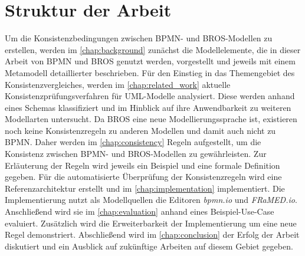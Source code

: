 \section{Struktur der Arbeit}

Um die Konsistenzbedingungen zwischen BPMN- und BROS-Modellen zu erstellen, werden im \cref{chap:background} zunächst die Modellelemente, die in dieser Arbeit von BPMN und BROS genutzt werden, vorgestellt und jeweils mit einem Metamodell detaillierter beschrieben.
Für den Einstieg in das Themengebiet des Konsistenzvergleiches, werden im \cref{chap:related_work} aktuelle Konsistenzprüfungsverfahren für UML-Modelle analysiert.
Diese werden anhand eines Schemas klassifiziert und im Hinblick auf ihre Anwendbarkeit zu weiteren Modellarten untersucht.
Da BROS eine neue Modellierungssprache ist, existieren noch keine Konsistenzregeln zu anderen Modellen und damit auch nicht zu BPMN.
Daher werden im \cref{chap:consistency} Regeln aufgestellt, um die Konsistenz zwischen BPMN- und BROS-Modellen zu gewährleisten.
Zur Erläuterung der Regeln wird jeweils ein Beispiel und eine formale Definition gegeben.
Für die automatisierte Überprüfung der Konsistenzregeln wird eine Referenzarchitektur erstellt und im \cref{chap:implementation} implementiert.
Die Implementierung nutzt als Modellquellen die Editoren \emph{bpmn.io} und \emph{FRaMED.io}.
Anschließend wird sie im \cref{chap:evaluation} anhand eines Beispiel-Use-Case evaluiert.
Zusätzlich wird die Erweiterbarkeit der Implementierung um eine neue Regel demonstriert.
Abschließend wird im \cref{chap:conclusion} der Erfolg der Arbeit diskutiert und ein Ausblick auf zukünftige Arbeiten auf diesem Gebiet gegeben.

